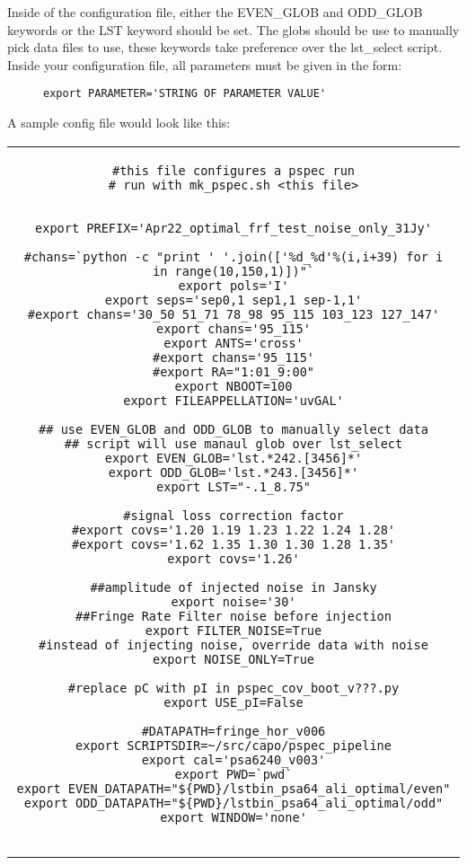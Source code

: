 \documentclass[onecolumn]{emulateapj}
\begin{document}
{{Inside of the configuration file, either the EVEN\_GLOB and ODD\_GLOB keywords or the LST keyword should be set. The globs should be use to manually pick data files to use, these keywords take preference over the lst\_select script. 
Inside your configuration file, all parameters must be given in the form:

\begin{figure}[h!]
\centering
\begin{lstlisting}[numbers=none]
 export PARAMETER='STRING OF PARAMETER VALUE'
\end{lstlisting}

\end{figure}
 
\clearpage
A sample config file would look like this:


\begin{tabular}{c}
\begin{lstlisting}[name='pspec_psa128.cfg']
#this file configures a pspec run
# run with mk_pspec.sh <this file>


export PREFIX='Apr22_optimal_frf_test_noise_only_31Jy'

#chans=`python -c "print ' '.join(['%d_%d'%(i,i+39) for i in range(10,150,1)])"`
export pols='I'
export seps='sep0,1 sep1,1 sep-1,1'
#export chans='30_50 51_71 78_98 95_115 103_123 127_147'
export chans='95_115'
export ANTS='cross'
#export chans='95_115'
#export RA="1:01_9:00"
export NBOOT=100
export FILEAPPELLATION='uvGAL'

## use EVEN_GLOB and ODD_GLOB to manually select data
## script will use manaul glob over lst_select
export EVEN_GLOB='lst.*242.[3456]*'
export ODD_GLOB='lst.*243.[3456]*'
export LST="-.1_8.75"

#signal loss correction factor
#export covs='1.20 1.19 1.23 1.22 1.24 1.28'
#export covs='1.62 1.35 1.30 1.30 1.28 1.35'
export covs='1.26'

##amplitude of injected noise in Jansky
export noise='30'
##Fringe Rate Filter noise before injection
export FILTER_NOISE=True
#instead of injecting noise, override data with noise
export NOISE_ONLY=True

#replace pC with pI in pspec_cov_boot_v???.py
export USE_pI=False

#DATAPATH=fringe_hor_v006
export SCRIPTSDIR=~/src/capo/pspec_pipeline
export cal='psa6240_v003'
export PWD=`pwd`
export EVEN_DATAPATH="${PWD}/lstbin_psa64_ali_optimal/even"
export ODD_DATAPATH="${PWD}/lstbin_psa64_ali_optimal/odd"
export WINDOW='none'


\end{lstlisting}
\end{tabular}}}
\end{document}
